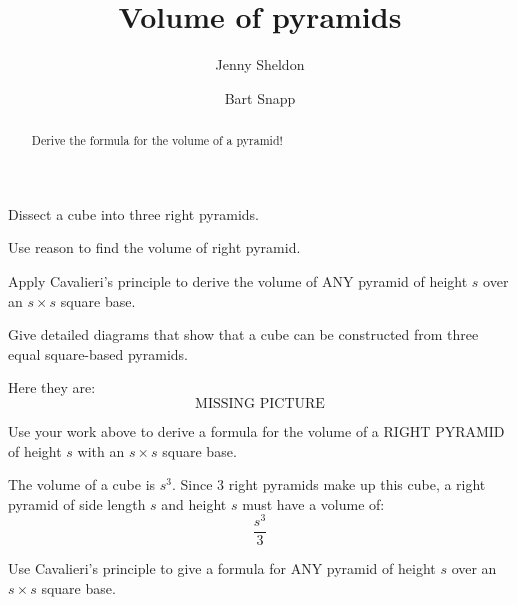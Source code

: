 \documentclass[handout,nooutcomes,noauthor]{ximera}
\title{Volume of pyramids}
\author{Jenny Sheldon \and Bart Snapp}
\begin{document}
\begin{abstract}
  Derive the formula for the volume of a pyramid!
\end{abstract}
\maketitle


\begin{listOutcomes}
\item Dissect a cube into three right pyramids.
\item Use reason to find the volume of right pyramid.
\item Apply Cavalieri's principle to derive the volume of ANY pyramid
  of height $s$ over an $s\times s$ square base.
\end{listOutcomes}


\mynewpage


\begin{question}
  Give detailed diagrams that show that a cube can be constructed from
  three equal square-based pyramids.
  \begin{freeResponse}
    Here they are:
    \[
    \text{MISSING PICTURE}
    \]
  \end{freeResponse}
\end{question}
\mynewpage


\begin{question} 
  Use your work above to derive a formula for the volume of a RIGHT
  PYRAMID of height $s$ with an $s\times s$ square base.
  \begin{freeResponse}
    The volume of a cube is $s^3$. Since $3$ right pyramids make up
    this cube, a right pyramid of side length $s$ and height $s$ must
    have a volume of:
    \[
    \frac{s^3}{3}
    \]
  \end{freeResponse}
\end{question}
\mynewpage

\begin{question}
  Use Cavalieri's principle to give a formula for ANY pyramid of
  height $s$ over an $s\times s$ square base.
\end{question}
\end{document}
